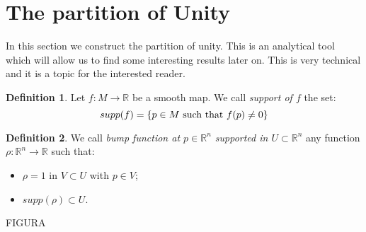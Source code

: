 \documentclass[12pt,a4paper]{report}
\theoremstyle{definition}
\newtheorem{Def}{Definition}[chapter]
\theoremstyle{Theorem}
\theoremstyle{definition}
\theoremstyle{definition}
\begin{document}
		\section{The partition of Unity}
			In this section we construct the partition of unity. This is an analytical tool which will allow us to find some interesting results later on. This is very technical and it is a topic for the interested reader.
			\begin{Def}
				 Let $f:M\rightarrow \mathbb{R}$ be a smooth map. We call \textit{support of $f$} the set:
				 $$supp(f)=\{p\in M\hbox{ such that } f(p)\neq 0\}$$
			\end{Def}
			\begin{Def}
				We call \textit{bump function at $p\in\mathbb{R}^n$ supported in $U\subset \mathbb{R}^n$} any function $\rho:\mathbb{R}^n\rightarrow \mathbb{R}$ such that:
				\begin{itemize}
					\item $\rho=1$ in $V\subset U$ with $p\in V$;
					\item $supp(\rho)\subset U$.
				\end{itemize}
			\end{Def}
			FIGURA\\
			\\
\end{document}
